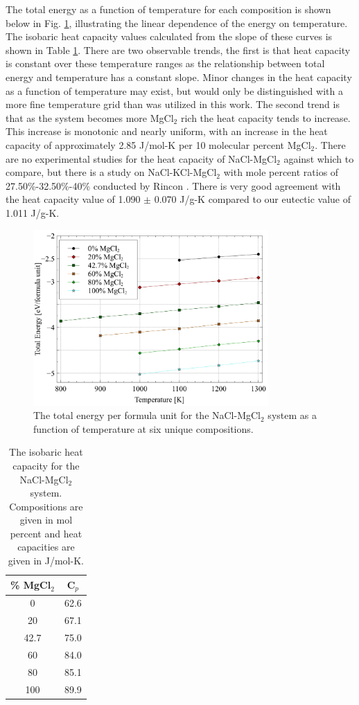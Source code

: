 \documentclass[review]{elsarticle}
\begin{document}
\FloatBarrier

The total energy as a function of temperature for each composition is shown below in Fig. \ref{fig:energy}, illustrating the linear dependence of the energy on temperature. The isobaric heat capacity values calculated from the slope of these curves is shown in Table \ref{table:cp}. There are two observable trends, the first is that heat capacity is constant over these temperature ranges as the relationship between total energy and temperature has a constant slope. Minor changes in the heat capacity as a function of temperature may exist, but would only be distinguished with a more fine temperature grid than was utilized in this work. The second trend is that as the system becomes more MgCl$_2$ rich the heat capacity tends to increase. This increase is monotonic and nearly uniform, with an increase in the heat capacity of approximately 2.85 J/mol-K per 10 molecular percent MgCl$_2$. There are no experimental studies for the heat capacity of NaCl-MgCl$_2$ against which to compare, but there is a study on NaCl-KCl-MgCl$_2$ with mole percent ratios of 27.50\%-32.50\%-40\% conducted by Rincon \cite{del2020experimental}. There is very good agreement with the heat capacity value of 1.090 $\pm$ 0.070 J/g-K compared to our eutectic value of 1.011 J/g-K.

\begin{figure}[h]
 \centering
 \includegraphics[width=0.8\textwidth]{images/energy.jpg} 
 \caption{The total energy per formula unit for the NaCl-MgCl$_2$ system as a function of temperature at six unique compositions.}
 \label{fig:energy}
\end{figure}

\begin{table}[h!]
\centering
\caption{The isobaric heat capacity for the NaCl-MgCl$_2$ system. Compositions are given in mol percent and heat capacities are given in J/mol-K.}
\begin{tabular}{|c|c|}
\hline
\% MgCl$_2$ &  C$_p$\\
\hline
0  &  62.6\\
20 &  67.1  \\
42.7  &  75.0  \\
60 &  84.0  \\
80 &  85.1  \\
100 &  89.9  \\
\hline
\end{tabular}
\label{table:cp}
\end{table}
\end{document}
